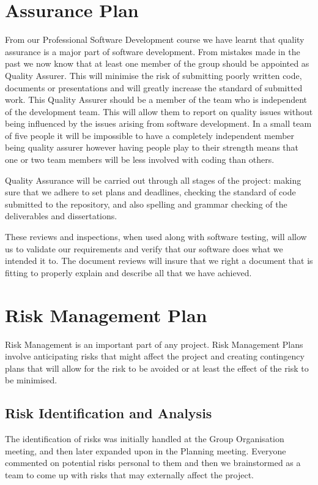 \documentclass{l3proj}
\begin{document}
\section{Assurance Plan}
\label{sect:a-plan}                                                                               
From our Professional Software Development course we have learnt that quality
assurance is a major part of software development. From mistakes made in the
past we now know that at least one member of the group should be appointed as
Quality Assurer. This will minimise the risk of submitting poorly written code,
documents or presentations and will greatly increase the standard of submitted
work. This Quality Assurer should be a member of the team who is independent of
the development team. This will allow them to report on quality issues without
being influenced by the issues arising from software development. In a small
team of five people it will be impossible to have a completely independent
member being quality assurer however having people play to their strength means
that one or two team members will be less involved with coding than others.

Quality Assurance will be carried out through all stages of the project: making
sure that we adhere to set plans and deadlines, checking the standard of code
submitted to the repository, and also spelling and grammar checking of the
deliverables and dissertations.

These reviews and inspections, when used along with software testing, will
allow us to validate our requirements and verify that our software does what we
intended it to. The document reviews will insure that we right a document that
is fitting to properly explain and describe all that we have achieved.

\section{Risk Management Plan}
\label{sect:risk-man}
Risk Management is an important part of any project. Risk Management Plans
involve anticipating risks that might affect the project and creating
contingency plans that will allow for the risk to be avoided or at least the
effect of the risk to be minimised.

\subsection{Risk Identification and Analysis} 
The identification of risks was initially handled at the Group Organisation
meeting, and then later expanded upon in the Planning meeting. Everyone
commented on potential risks personal to them and then we brainstormed as a
team to come up with risks that may externally affect the project.
\end{document}

